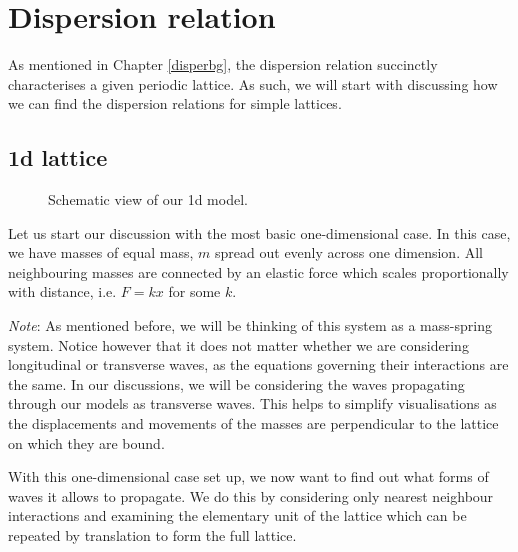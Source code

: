 \chapter{Dispersion relation}
\label{disperrel}
As mentioned in Chapter \ref{disperbg}, the dispersion relation succinctly
characterises a given periodic lattice. As such, we will start with discussing
how we can find the dispersion relations for simple lattices.

\section{1d lattice}
\begin{figure}[!h]
\begin{center}
  \caption{\label{fig:sqscheme1d} Schematic view of our 1d model.}
\end{center}
\end{figure}

Let us start our discussion with the most basic one-dimensional case. In this
case, we have masses of equal mass, $m$ spread out evenly across one dimension.
All neighbouring masses are connected by an elastic force which scales
proportionally with distance, i.e. $F = kx$ for some $k$.

\textit{Note}: As mentioned before, we will be thinking of this system as a
mass-spring system. Notice however that it does not matter whether we are
considering longitudinal or transverse waves, as the equations governing their
interactions are the same. In our discussions, we will be considering the waves
propagating through our models as transverse waves. This helps to simplify
visualisations as the displacements and movements of the masses are
perpendicular to the lattice on which they are bound.

With this one-dimensional case set up, we now want to find out what forms of
waves it allows to propagate. We do this by considering only nearest neighbour
interactions and examining the elementary unit of the lattice which can be
repeated by translation to form the full lattice.

